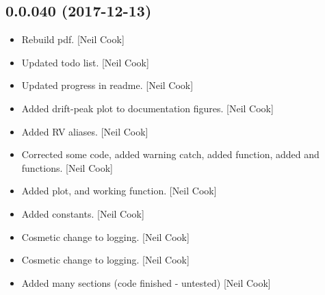 \documentclass[a4paper,10pt,english]{report}
\begin{document}
\subsection{0.0.040 (2017-12-13)}
\label{\detokenize{misc/changelog:id511}}\begin{itemize}
\item {} 
Rebuild pdf. {[}Neil Cook{]}

\item {} 
Updated todo list. {[}Neil Cook{]}

\item {} 
Updated progress in readme. {[}Neil Cook{]}

\item {} 
Added drift-peak plot to documentation figures. {[}Neil Cook{]}

\item {} 
Added RV aliases. {[}Neil Cook{]}

\item {} 
Corrected some code, added warning catch, added  function,
added  and  functions. {[}Neil Cook{]}

\item {} 
Added  plot,  and working
function. {[}Neil Cook{]}

\item {} 
Added  constants. {[}Neil Cook{]}

\item {} 
Cosmetic change to logging. {[}Neil Cook{]}

\item {} 
Cosmetic change to logging. {[}Neil Cook{]}

\item {} 
Added many sections (code finished - untested) {[}Neil Cook{]}

\end{itemize}
\end{document}
